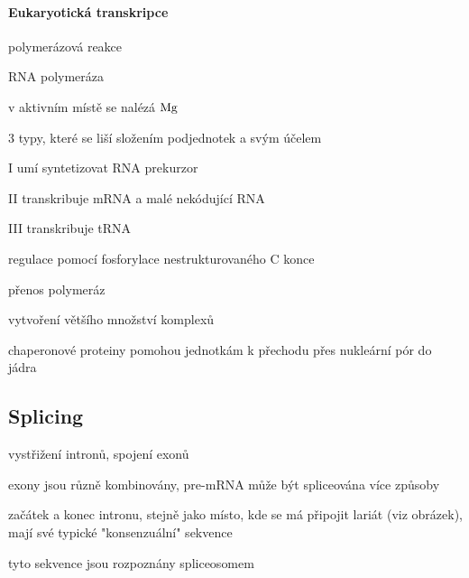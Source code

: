 \documentclass[DIV=8]{scrreprt}
\begin{document}
\paragraph{Eukaryotická transkripce}
\begin{myItemize}[nosep]
    \item polymerázová reakce
    \item RNA polymeráza
\begin{myItemize}[nosep]
    \item v aktivním místě se nalézá \(\ce{Mg}\)
    \item 3 typy, které se liší složením podjednotek a svým účelem
\begin{myItemize}[nosep]
    \item I umí syntetizovat RNA prekurzor
    \item II transkribuje mRNA a malé nekódující RNA
    \item III transkribuje tRNA
\end{myItemize}

    \item regulace pomocí fosforylace nestrukturovaného C konce
\end{myItemize}

    \item přenos polymeráz
\begin{myItemize}[nosep]
    \item vytvoření většího množství komplexů
    \item chaperonové proteiny pomohou jednotkám k přechodu přes nukleární pór do jádra
\end{myItemize}

\end{myItemize}



\subsection{Splicing} \label{Splicing}


\begin{myItemize}[nosep]
    \item vystřižení intronů, spojení exonů
    \item exony jsou různě kombinovány, pre-mRNA může být spliceována více způsoby
    \item začátek a konec intronu, stejně jako místo, kde se má připojit lariát (viz obrázek), mají své typické "konsenzuální" sekvence
\begin{myItemize}[nosep]
    \item tyto sekvence jsou rozpoznány spliceosomem
\end{myItemize}

\end{myItemize}
\end{document}
